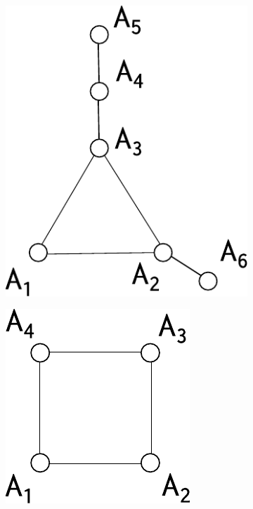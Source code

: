 \documentclass[a4paper]{article}
\theoremstyle{definition}
\begin{document}
\begin{figure}[h]
    \begin{subfigure}{.3\textwidth}
        \center
        \includegraphics[width=.8\textwidth]{prob_graph1.pdf}
        \caption{}
        \label{fig:jointprob_graph1}
    \end{subfigure}
    \begin{subfigure}{.3\textwidth}
        \center
        \includegraphics[width=.7\textwidth]{CHSH_obs.pdf}
        \caption{}
        \label{fig:jointprob_CHSH}

\end{subfigure}
\end{figure}
\end{document}
